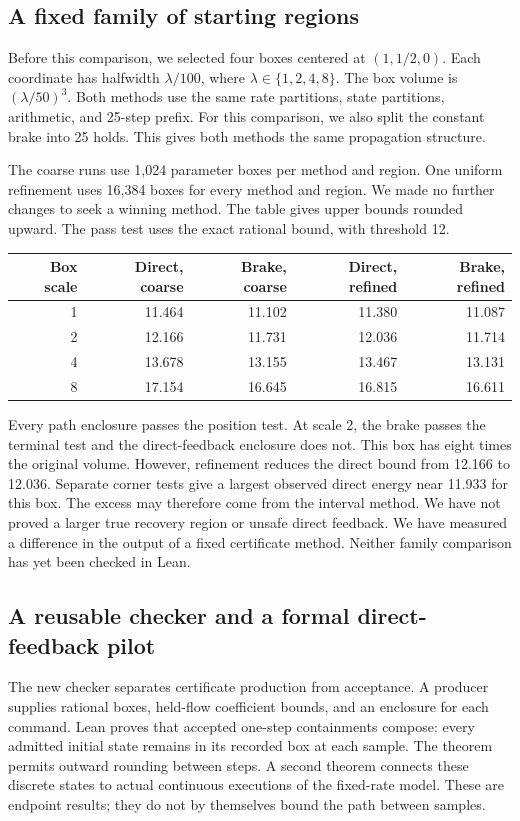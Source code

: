 \documentclass[10pt]{article}
\begin{document}
\subsection{A fixed family of starting regions}
Before this comparison, we selected four boxes centered at $(1,1/2,0)$. Each coordinate has halfwidth $\lambda/100$, where $\lambda\in\{1,2,4,8\}$. The box volume is $(\lambda/50)^3$. Both methods use the same rate partitions, state partitions, arithmetic, and 25-step prefix. For this comparison, we also split the constant brake into 25 holds. This gives both methods the same propagation structure.

The coarse runs use 1,024 parameter boxes per method and region. One uniform refinement uses 16,384 boxes for every method and region. We made no further changes to seek a winning method. The table gives upper bounds rounded upward. The pass test uses the exact rational bound, with threshold 12.

\begin{center}\small
\begin{tabular}{@{}rrrrr@{}}
\toprule
Box scale & Direct, coarse & Brake, coarse & Direct, refined & Brake, refined\\\midrule
1 & 11.464 & 11.102 & 11.380 & 11.087\\
2 & 12.166 & 11.731 & 12.036 & 11.714\\
4 & 13.678 & 13.155 & 13.467 & 13.131\\
8 & 17.154 & 16.645 & 16.815 & 16.611\\\bottomrule
\end{tabular}
\end{center}

Every path enclosure passes the position test. At scale 2, the brake passes the terminal test and the direct-feedback enclosure does not. This box has eight times the original volume. However, refinement reduces the direct bound from 12.166 to 12.036. Separate corner tests give a largest observed direct energy near 11.933 for this box. The excess may therefore come from the interval method. We have not proved a larger true recovery region or unsafe direct feedback. We have measured a difference in the output of a fixed certificate method. Neither family comparison has yet been checked in Lean.

\subsection{A reusable checker and a formal direct-feedback pilot}
The new checker separates certificate production from acceptance. A producer supplies rational boxes, held-flow coefficient bounds, and an enclosure for each command. Lean proves that accepted one-step containments compose: every admitted initial state remains in its recorded box at each sample. The theorem permits outward rounding between steps. A second theorem connects these discrete states to actual continuous executions of the fixed-rate model. These are endpoint results; they do not by themselves bound the path between samples.
\end{document}
